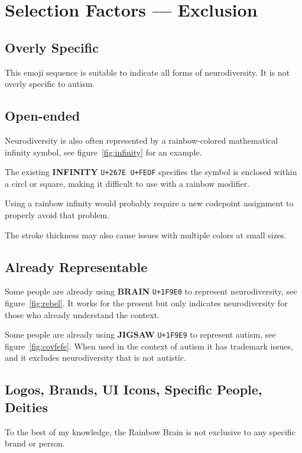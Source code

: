 \section{Selection Factors --- Exclusion}

\subsection{Overly Specific}

This emoji sequence is suitable to indicate all forms of neurodiversity. It is not overly specific to autism.

\subsection{Open-ended}

Neurodiversity is also often represented by a rainbow-colored mathematical infinity symbol, see figure~\ref{fig:infinity} for an example.

The existing \textbf{INFINITY} \texttt{U+267E U+FEOF} specifies the symbol is enclosed within a circl or square, making it difficult to use with a rainbow modifier.

Using a rainbow infinity would probably require a new codepoint assignment to properly avoid that problem.

The stroke thickness may also cause issues with multiple colors at small sizes.

\subsection{Already Representable}

Some people are already using \textbf{BRAIN} \texttt{U+1F9E0} to represent neurodiversity, see figure~\ref{fig:rebel}. It works for the present but only indicates neurodiversity for those who already understand the context.

Some people are already using \textbf{JIGSAW} \texttt{U+1F9E9} to represent autism, see figure~\ref{fig:covfefe}. When used in the context of autism it has trademark issues, and it excludes neurodiversity that is not autistic.

\subsection{Logos, Brands, UI Icons, Specific People, Deities}

To the best of my knowledge, the Rainbow Brain is not exclusive to any specific brand or person.

